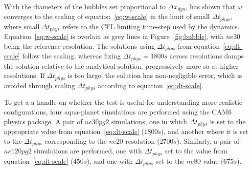 With the diameters of the bubbles set proportional to $\Delta x_{dyn}$, \cite{HR2018JAMES} has shown that $\omega$ converges to the scaling of equation~\eqref{eq:w-scale} in the limit of small $\Delta t_{phys}$, where small $\Delta t_{phys}$ refers to the CFL limiting time-step used by the dynamics. Equation~\eqref{eq:w-scale} is overlain as grey lines in Figure~\ref{fig:bubble}, with $ne30$ being the reference resolution. The solutions using $\Delta t_{phys}$ from equation~\eqref{eq:dt-scale} follow the scaling, whereas fixing $\Delta t_{phys} = 1800s$ across resolutions damps the solution relative to the analytical solution, progressively more so at higher resolutions. If $\Delta t_{phys}$ is too large, the solution has non-negligible error, which is avoided through scaling $\Delta t_{phys}$ according to equation~\eqref{eq:dt-scale}.

To get a a handle on whether the test is useful for understanding more realistic configurations, four aqua-planet simulations are performed using the CAM6 physics package. A pair of $ne30pg2$ simulations, one in which $\Delta t_{phys}$ is set to the appropriate value from equation~\eqref{eq:dt-scale} ($1800s$), and another where it is set to the $\Delta t_{phys}$ corresponding to the $ne20$ resolution ($2700s$). Similarly, a pair of $ne120pg2$ simulations are performed, one with $\Delta t_{phys}$ set to the value from equation~\eqref{eq:dt-scale} ($450s$), and one with $\Delta t_{phys}$ set to the $ne80$ value ($675s$). 

